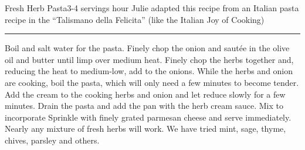 \begin{recipe}{Fresh Herb Pasta}{3-4 servings}{ hour}
\freeform Julie adapted this recipe from an Italian pasta recipe in the ``Talismano della Felicita'' (like the Italian Joy of Cooking)\\
\rule{\textwidth}{0.05pt}
Boil and salt water for the pasta.
Finely chop the onion and saut\'{e}e in the olive oil and butter until limp over medium heat.
Finely chop the herbs together and, reducing the heat to medium-low, add to the onions. While the herbs and onion are cooking, boil the pasta, which will only need a few minutes to become tender.
Add the cream to the cooking herbs and onion and let reduce slowly for a few minutes. Drain the pasta and add the pan with the herb cream sauce. Mix to incorporate
Sprinkle with finely grated parmesan cheese and serve immediately.
\freeform Nearly any mixture of fresh herbs will work. We have tried mint, sage, thyme, chives, parsley and others.
\end{recipe}
